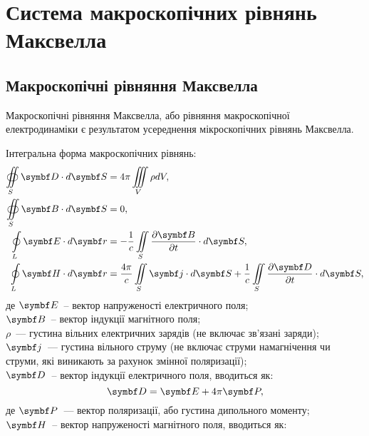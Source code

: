 \newpage
\chapter{Система \mbox{макроскопічних} рівнянь Максвелла}


\section{Макроскопічні рівняння Максвелла}

Макроскопічні рівняння Максвелла, або рівняння макроскопічної електродинаміки є результатом усереднення мікроскопічних рівнянь Максвелла.

Інтегральна форма макроскопічних рівнянь:
\begin{align}
	\oiint\limits_S \Dfield\cdot d\vect{S} & = 4\pi\iiint\limits_{V}\rho dV,   \label{essInt I}                                                                                                         \\
	\oiint\limits_S \Bfield\cdot d\vect{S} & = 0,   \label{essInt II}                                                                                                                                   \\
	\oint\limits_L \Efield\cdot d\vect{r}  & = - \frac1c \iint\limits_S \frac{\partial\Bfield}{\partial t}\cdot d\vect{S},  \label{Int III}                                                             \\
	\oint\limits_L \Hfield\cdot d\vect{r}  & =\dfrac{4\pi}{c} \iint\limits_S \vect{j}\cdot d\vect{S} +\frac{1}{c} \iint\limits_S  \frac{\partial\Dfield}{\partial t}\cdot d\vect{S},  \label{essInt IV}
\end{align}
де $ \Efield $~-- вектор напруженості електричного поля;\\
\hspace*{3ex}$ \Bfield $~-- вектор індукції магнітного поля; \\
\hspace*{3ex}$ \rho $~--- густина вільних електричних зарядів (не включає зв'язані заряди); \\
\hspace*{3ex}$\vect{j}$~--- густина вільного струму (не включає струми намагнічення чи струми, які виникають за рахунок змінної поляризації); \\
$ \Dfield $~-- вектор індукції електричного поля, вводиться як:
\begin{equation}
	\Dfield = \Efield + 4\pi\vect{P},
\end{equation}
де $\vect{P}$~---  вектор поляризації, або густина дипольного моменту;\\
\hspace*{2ex} $ \Hfield $~-- вектор напруженості магнітного поля, вводиться як:

